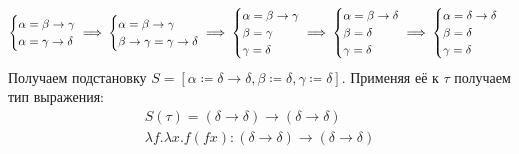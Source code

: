 \begin{example}
    \[
        \begin{cases}
            \alpha=\beta\to\gamma \\
            \alpha=\gamma\to\delta
        \end{cases} \mkern-18mu
        \implies
        \begin{cases}
            \alpha=\beta\to\gamma \\
            \beta\to\gamma=\gamma\to\delta
        \end{cases} \mkern-18mu
        \implies
        \begin{cases}
            \alpha=\beta\to\gamma \\
            \beta=\gamma \\
            \gamma=\delta
        \end{cases} \mkern-18mu
        \implies
        \begin{cases}
            \alpha=\beta\to\delta \\
            \beta=\delta \\
            \gamma=\delta
        \end{cases} \mkern-18mu
        \implies
        \begin{cases}
            \alpha=\delta\to\delta \\
            \beta=\delta \\
            \gamma=\delta
        \end{cases}
    \]
    Получаем подстановку $S = \left[\alpha\coloneqq\delta\to\delta, \beta\coloneqq\delta, \gamma\coloneqq\delta\right]$.
    Применяя её к $\tau$ получаем тип выражения:
    \begin{gather*}
        S(\tau) = (\delta\to\delta)\to(\delta\to\delta) \\
        \lambda f . \lambda x . f (f x) : (\delta\to\delta)\to(\delta\to\delta)
    \end{gather*}
\end{example}

%
